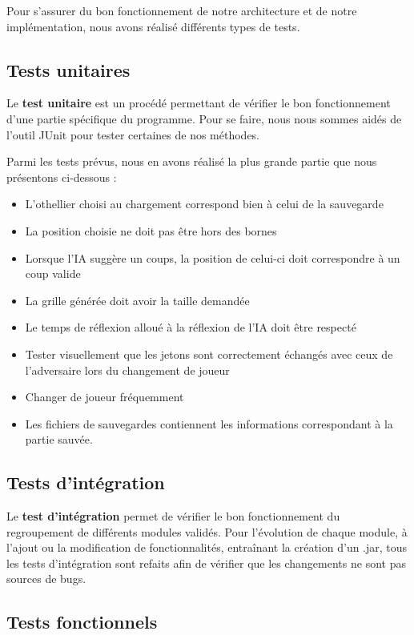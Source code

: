 \documentclass[a4paper,12pt]{report}
\begin{document}
Pour s’assurer du bon fonctionnement de notre architecture et de notre implémentation, nous avons réalisé différents types de tests.

\subsection{Tests unitaires}

Le \textbf{test unitaire} est un procédé permettant de vérifier le bon fonctionnement d’une partie spécifique du programme. Pour se faire, nous nous sommes aidés de l’outil JUnit pour tester certaines de nos méthodes.

Parmi les tests prévus, nous en avons réalisé la plus grande partie que nous présentons ci-dessous :

\begin{itemize}
\item L’othellier choisi au chargement correspond bien à celui de la sauvegarde
\item La position choisie ne doit pas être hors des bornes
\item Lorsque l’IA suggère un coups, la position de celui-ci doit correspondre à un coup valide
\item La grille générée doit avoir la taille demandée
\item Le temps de réflexion alloué à la réflexion de l’IA doit être respecté
\item Tester visuellement que les jetons sont correctement échangés avec ceux de l’adversaire lors du changement de joueur
\item Changer de joueur fréquemment
\item Les fichiers de sauvegardes contiennent les informations correspondant à la partie sauvée.
\end{itemize}

\subsection{Tests d’intégration}

Le \textbf{test d’intégration} permet de vérifier le bon fonctionnement du regroupement de différents modules validés. 
Pour l’évolution de chaque module, à l’ajout ou la modification de fonctionnalités, entraînant la création d’un .jar, tous les tests d’intégration sont refaits afin de vérifier que les changements ne sont pas sources de bugs. 

\subsection{Tests fonctionnels}
\end{document}
